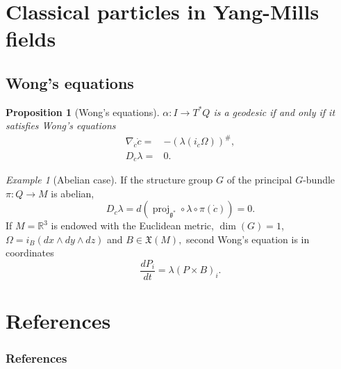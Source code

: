 \documentclass [xcolor=svgnames, t] {beamer}
\theoremstyle{definition}
\theoremstyle{plain}
\newtheorem{prop}{Proposition}
\theoremstyle{remark}
\newtheorem{ex}{Example}
\begin{document}
\section[Yang-Mills]{Classical particles in Yang-Mills fields}%
\subsection{Wong's equations}%
\label{sub:wong_s_equations}
\begin{frame}
\begin{prop}[Wong's equations]
	$ \alpha: I \rightarrow T^*Q $ is a geodesic if and only if it satisfies Wong's equations
	\begin{align}
		\nabla_{\dot{c}}\dot{c} =& -(\lambda(i_{\dot{c}}\Omega))^\#,\\
		D_{\dot{c}}\lambda =& 0.
	\end{align}
\end{prop}
\begin{ex}[Abelian case]
	If the structure group $ G $ of the principal $ G $-bundle $ \pi: Q \rightarrow M $ is abelian,
	$$  D_{\dot{c}}\lambda = d( \operatorname{proj}_{ \mathfrak{g}^*}\circ \lambda\circ\pi(\dot{c}))=0. $$ 
	If $ M = \mathbb{R}^3 $ is endowed with the Euclidean metric, $ \operatorname{dim} (G)=1 $, $ \Omega= i_B(dx\wedge dy\wedge dz) $ and $ B\in \mathfrak{X}(M), $ second Wong's equation is in coordinates 
	$$ \frac{d P_i}{dt} =\lambda (P\times B)_i. $$ 
\end{ex}
\end{frame}

\section{References}
\begin{frame} [allowframebreaks]\frametitle{References}
        
	\nocite{*}
        
\end{frame}
\end{document}
